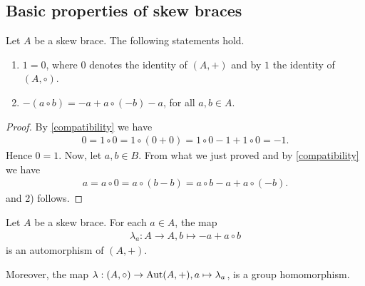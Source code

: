     
    \subsection{Basic properties of skew braces}

    \begin{lemma}\label{lem:propskew}
        Let $A$ be a skew brace. The following statements hold.
        \begin{enumerate}
            \item $1=0$, where $0$ denotes the identity of $(A,+)$ and by $1$ the identity of $(A,\circ)$.
            \item $-(a\circ b) = - a + a\circ(- b) - a$, for all $a,b \in A$.
        \end{enumerate}
    \end{lemma}
    \begin{proof}
        By \eqref{compatibility} we have
        \begin{align*}
            0= 1\circ 0 = 1 \circ (0+0) = 1\circ 0 -1 + 1 \circ 0 = -1.
        \end{align*}
        Hence $0=1$. 
        Now, let $a,b\in B$. From what we just proved and by \eqref{compatibility}
        we have 
        \begin{align*}
            a = a \circ 0 = a\circ (b-b) = a\circ b - a + a\circ (-b).
        \end{align*}
        and 2) follows. 
    \end{proof}
    
    \begin{proposition}\label{prop:lambda}
        Let $A$ be a skew brace. For each $a\in A$, the map 
        \begin{align*}
            \lambda_a:A\to A, b\mapsto -a + a \circ b
        \end{align*}
    is an automorphism of $(A,+)$. 
    
    Moreover, the map $\lambda: (A,\circ) \to \operatorname{Aut}(A,+), a \mapsto \lambda_a$, is a group homomorphism.
    \end{proposition}

